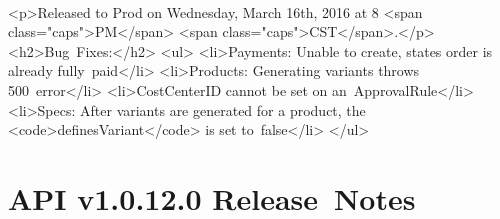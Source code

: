 \documentclass{memoir}%
\begin{document}
%
\paragraph*{}%
<p>Released to Prod on Wednesday, March 16th, 2016 at 8 <span class="caps">PM</span> <span class="caps">CST</span>.</p>\newline%
<h2>Bug~Fixes:</h2>\newline%
<ul>\newline%
<li>Payments: Unable to create, states order is already fully~paid</li>\newline%
<li>Products: Generating variants throws 500~error</li>\newline%
<li>CostCenterID cannot be set on an~ApprovalRule</li>\newline%
<li>Specs: After variants are generated for a product, the <code>definesVariant</code> is set to~false</li>\newline%
</ul>

%
\section*{API v1.0.12.0 Release~Notes}%
\paragraph*{}%

%
\end{document}
